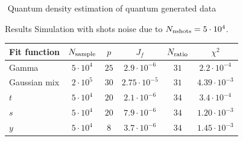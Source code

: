 \documentclass[20pt, final]{beamer}
\newlength{\colwidth}
\begin{document}
\begin{frame}[t]
\begin{columns}[t]
\begin{column}{\colwidth}
\begin{block}{\faMagic\,\,Quantum density estimation of quantum generated data}
\begin{alertblock}{Results}
Simulation with shots noise due to $N_{\rm nshots}=5\cdot 10^4$.
\vspace{1cm}
  \begin{center}
  \begin{tabular}{lccccc}
  \hline \hline
    Fit function & $N_{\rm sample}$ & $p$ & $J_f$ & $N_{\rm ratio}$ & $\chi^2$\\
  \hline
    Gamma & $5 \cdot 10^4$ & $25$ & $2.9 \cdot 10^{-6}$ & $31$ & $2.2\cdot10^{-4}$ \\
    Gaussian mix & $2 \cdot 10^5$ & $30$ & $2.75 \cdot 10^{-5}$ & $31$ & $4.39 \cdot 10^{-3}$ \\
    $t$ & $5\cdot 10^4$ & $20$ & $2.1 \cdot 10^{-6}$ & $34$ & $3.4 \cdot 10^{-4}$ \\
    $s$ & $5\cdot 10^4$ & $20$ & $7.9 \cdot 10^{-6}$ & $34$ & $1.20 \cdot 10^{-3}$\\
    $y$ & $5\cdot 10^4$ & $8$ & $3.7 \cdot 10^{-6}$ & $34$ & $1.45 \cdot 10^{-3}$\\
  \hline \hline
  \end{tabular}
\end{center}

  \end{alertblock}

  \end{block}


\end{column}
\end{columns}
\end{frame}
\end{document}
